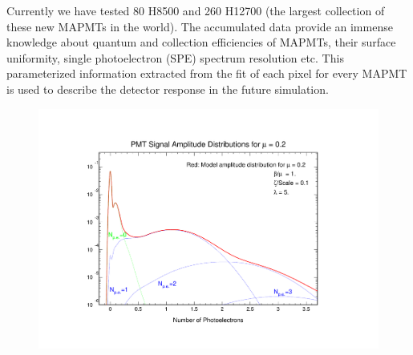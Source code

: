 Currently we have tested 80 H8500 and 260 H12700 (the largest collection of these new MAPMTs in the world).
The accumulated data provide an immense knowledge about quantum and collection efficiencies of MAPMTs, their surface uniformity, single photoelectron (SPE) spectrum resolution etc.
This parameterized information extracted from the fit of each pixel for every MAPMT is used to describe the detector response in the future simulation.


\begin{figure}[t]
	\centering
	\includegraphics[width=\linewidth]{figures/model.pdf}
	\caption{}
	\label{fig:Model}
\end{figure}